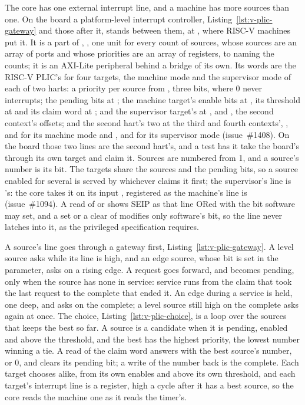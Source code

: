 \documentclass[journal,onecolumn,9pt]{IEEEtran}
\begin{document}
The core has one external interrupt line, and a machine has more
sources than one. On the board a platform-level interrupt controller,
Listing~\ref{lst:v-plic-gateway} and those after it, stands between
them, at , where RISC-V machines put it. It is a
part of , , one unit for every
count of sources, whose sources are an array of ports and whose
priorities are an array of registers,  to 
naming the counts; it is an AXI-Lite peripheral behind a bridge of
its own. Its words are the
RISC-V PLIC's for four targets, the machine mode and the supervisor
mode of each of two harts: a priority per source from ,
three bits, where 0 never interrupts; the pending bits at
; the machine target's enable bits at , its
threshold at  and its claim word at
; and the supervisor target's at ,
 and , the second context's
offsets; and the second hart's two at the third and fourth
contexts', ,  and  for
its machine mode and ,  and
 for its supervisor mode (issue~\#1408). On the board
those two lines are the second hart's, and a test has it take the
board's  through its own target and claim it. Sources are
numbered from 1, and a source's number is its bit. The targets share
the sources and the pending bits, so a source enabled for several is
served by whichever claims it first; the
supervisor's line is 's: the core takes it on its
input , registered as the machine's line is (issue~\#1094).
A read of  or  shows SEIP as that line ORed with
the bit software may set, and a set or a clear of  modifies
only software's bit, so the line never latches into it, as the
privileged specification requires.

A source's line goes through a gateway first,
Listing~\ref{lst:v-plic-gateway}. A level source asks while its line is
high, and an edge source, whose bit is set in the 
parameter, asks on a rising edge. A request goes forward, and becomes
pending, only when the source has none in service: service runs from
the claim that took the last request to the complete that ended it.
An edge during a service is held, one deep, and asks on the complete;
a level source still high on the complete asks again at once.
The choice, Listing~\ref{lst:v-plic-choice}, is a loop over the
sources that keeps the best so far. A source is a candidate when it is pending,
enabled and above the threshold, and the best has the highest
priority, the lowest number winning a tie. A read of the claim word
answers with the best source's number, or 0, and clears its pending
bit; a write of the number back is the complete. Each target chooses
alike, from its own enables and above its own threshold, and each
target's interrupt line is a register, high a cycle after it has a
best source, so the core reads the machine one as it reads the
timer's.
\end{document}
